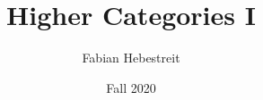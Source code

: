 \documentclass[a4paper, 10pt, oneside, DIV=9, chapterprefix=true, numbers=enddot,bibliography=totoc]{scrbook}
\title{Higher Categories I}
\author{Fabian Hebestreit}
\date{Fall 2020}
\begin{document}
\maketitle






\renewcommand\thechapter{\Roman{chapter}}






		
%
\end{document}
